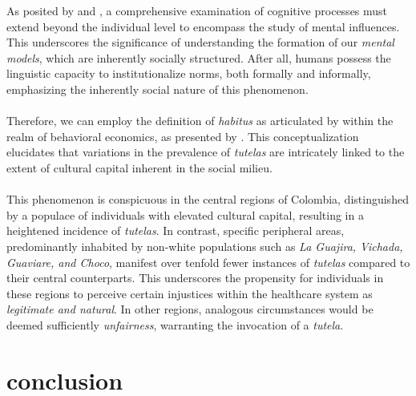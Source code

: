 \documentclass[12pt]{article}
\begin{document}
\begin{flushleft}
    As posited by \citet{lizardo2004cognitive} and \citet{piore2010bounded}, a comprehensive examination of cognitive processes must extend beyond the individual level to encompass the study of mental influences. This underscores the significance of understanding the formation of our \textit{mental models}, which are inherently socially structured. After all, humans possess the linguistic capacity to institutionalize norms, both formally and informally, emphasizing the inherently social nature of this phenomenon.\\~\\

    Therefore, we can employ the definition of \textit{habitus} as articulated by \citet{bourdieu2016distincion} within the realm of behavioral economics, as presented by \citet{hayes2020behavioral}. This conceptualization elucidates that variations in the prevalence of \textit{tutelas} are intricately linked to the extent of cultural capital inherent in the social milieu.\\~\\
    
    This phenomenon is conspicuous in the central regions of Colombia, distinguished by a populace of individuals with elevated cultural capital, resulting in a heightened incidence of \textit{tutelas}. In contrast, specific peripheral areas, predominantly inhabited by non-white populations such as \textit{La Guajira, Vichada, Guaviare, and Choco}, manifest over tenfold fewer instances of \textit{tutelas} compared to their central counterparts. This underscores the propensity for individuals in these regions to perceive certain injustices within the healthcare system as \textit{legitimate and natural}. In other regions, analogous circumstances would be deemed sufficiently \textit{unfairness}, warranting the invocation of a \textit{tutela}.

\end{flushleft}

\section*{conclusion}
\end{document}
